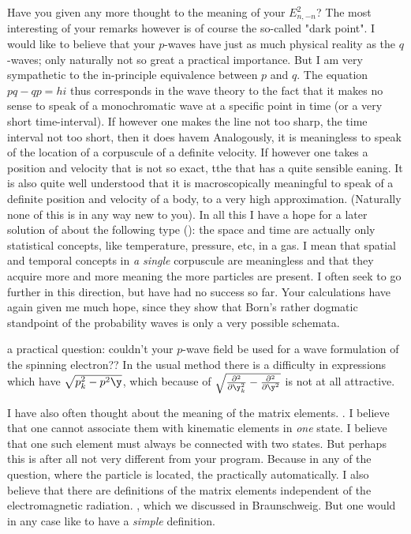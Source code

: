 \documentclass{article}
\begin{document}
Have you given any more thought to the meaning of your $E^2_{n,-n}$? The most interesting of your remarks however is of course the so-called "dark point". I would like to believe that your $p$-waves have just as much physical reality as the $q$-waves; only naturally not so great a practical importance. But I am very sympathetic to the in-principle equivalence between $p$ and $q$. The equation $pq-qp=hi$ thus corresponds in the wave theory to the fact that it makes no sense to speak of a monochromatic wave at a specific point in time (or a very short time-interval). If however one makes the line not too sharp, the time interval not too short, then it does havem Analogously, it is meaningless to speak of the location of a corpuscule of a definite velocity. If however one takes a position and velocity that is not so exact, tthe that has a quite sensible eaning.
 It is also quite well understood that it is macroscopically meaningful to speak of a definite position and velocity of a body, to a very high approximation. (Naturally none of this is in any way new to you). In all this I have a hope for a later solution of about the following type (): the space and time are actually only statistical concepts, like temperature, pressure, etc, in a gas. I mean that spatial and temporal concepts in \textit{a single} corpuscule are meaningless and that they acquire more and more meaning the more particles are present. I often seek to go further in this direction, but have had no success so far. Your calculations have again given me much hope, since they show that Born's rather dogmatic standpoint of the probability waves is only a very possible schemata.
 
 a practical question: couldn't your $p$-wave field be used for a  wave formulation of the spinning electron?? In the usual method there is a difficulty in expressions which have $\sqrt{p^2_k - p^2\y}$, which because of $\sqrt{\frac{\partial^2}{\partial \y_k^2} - \frac{\partial^2}{\partial \y^2}}$ is not at all attractive.

I have also often thought about the meaning of the matrix elements. . I believe that one cannot associate them with kinematic elements in \textit{one} state. I believe that one such element must always be connected with two states. But perhaps this is after all not very different from your program. Because in any  of the question, where the particle is located, the   practically automatically. I also believe that there are definitions of the matrix elements independent of the electromagnetic radiation. , which we discussed in Braunschweig. But one would in any case like to have a \textit{simple} definition.
\end{document}
